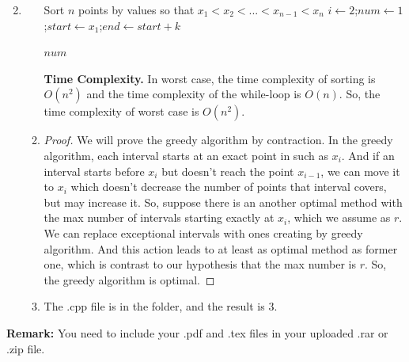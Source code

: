 \documentclass[12pt,a4paper]{article}
\makeatletter
\newtheorem*{solution}{Solution}
\theoremstyle{definition}
\renewenvironment{solution}[1][Solution] {\par\pushQED{\qed}\normalfont\topsep6\p@\@plus6\p@\relax\trivlist\item[\hskip\labelsep\bfseries#1\@addpunct{.}]\ignorespaces}{\popQED\endtrivlist\@endpefalse} \makeatother
\makeatother
\begin{document}
\begin{enumerate}
\begin{solution}
\begin{enumerate}
\begin{algorithm}[H]
				Sort $n$ points by values so that $x_1< x_2<...<x_{n-1}<x_n$\;
				$i\leftarrow 2$;$num\leftarrow 1$;$start\leftarrow x_1$;$end\leftarrow start+k$\;
				
				\Return $num$\;

			\end{algorithm}

            \textbf{Time Complexity.} In worst case, the time complexity of sorting is $O(n^2)$ and the time complexity of the while-loop is $O(n)$. So, the time complexity of worst case is $O(n^2)$.
			\item 
			\begin{proof}
				We will prove the greedy algorithm by contraction. In the greedy algorithm, each interval starts at an exact point in such as $x_i$. And if an interval starts before $x_i$ but doesn't reach the point $x_{i-1}$, we can move it to $x_i$ which doesn't decrease the number of points that interval covers,
				but may increase it. So, suppose there is an another optimal method with the max number of intervals starting exactly at $x_i$, which we assume as $r$. We can replace exceptional intervals with ones creating by greedy algorithm. And this action leads to at least as optimal method as former one, which is contrast to our hypothesis that the max number is $r$.
				So, the greedy algorithm is optimal.
			\end{proof}
			\item The .cpp file is in the folder, and the result is 3.
		\end{enumerate}
    \end{solution}

\end{enumerate}



\vspace{20pt}

\textbf{Remark:} You need to include your .pdf and .tex files in your uploaded .rar or .zip file.

\end{document}
